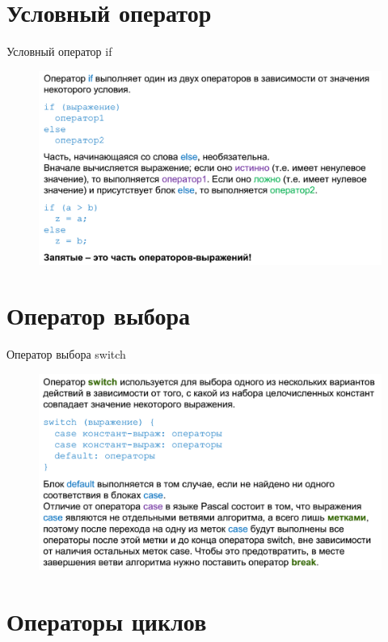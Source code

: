 \documentclass{beamer}
\begin{document}
\section{Условный оператор}

\begin{frame}{Условный оператор if}
\begin{figure}[h]
\centering
\includegraphics[scale=0.4]{images/lec02-pic14.png}
\end{figure}
\end{frame}

\section{Оператор выбора}

\begin{frame}{Оператор выбора switch}
\begin{figure}[h]
\centering
\includegraphics[scale=0.4]{images/lec02-pic15.png}
\end{figure}
\end{frame}

\section{Операторы циклов}
\end{document}
